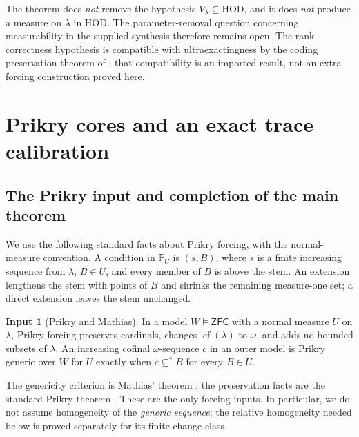 \documentclass[11pt,letterpaper]{article}
\theoremstyle{definition}
\newtheorem{inputthm}{Input}
\numberwithin{equation}{section}
\newcommand{\ZFC}{\mathsf{ZFC}}
\newcommand{\HOD}{\mathrm{HOD}}
\newcommand{\cf}{\operatorname{cf}}
\newcommand{\PP}{\mathbb P}
\newcommand{\substar}{\subseteq^{*}}
\begin{document}
The theorem does \emph{not} remove the hypothesis $V_\lambda\subseteq\HOD$, and it does \emph{not} produce a measure on $\lambda$ in HOD. The parameter-removal question concerning measurability in the supplied synthesis therefore remains open. The rank-correctness hypothesis is compatible with ultraexactingness by the coding preservation theorem of \cite[Proposition~3.9]{abgl}; that compatibility is an imported result, not an extra forcing construction proved here.

\section{Prikry cores and an exact trace calibration}\label{sec:consistency}

\subsection{The Prikry input and completion of the main theorem}

We use the following standard facts about Prikry forcing, with the normal-measure convention. A condition in $\PP_U$ is $(s,B)$, where $s$ is a finite increasing sequence from $\lambda$, $B\in U$, and every member of $B$ is above the stem. An extension lengthens the stem with points of $B$ and shrinks the remaining measure-one set; a direct extension leaves the stem unchanged.

\begin{inputthm}[Prikry and Mathias]\label{in:prikry}
In a model $W\models\ZFC$ with a normal measure $U$ on $\lambda$, Prikry forcing preserves cardinals, changes $\cf(\lambda)$ to $\omega$, and adds no bounded subsets of $\lambda$. An increasing cofinal $\omega$-sequence $c$ in an outer model is Prikry generic over $W$ for $U$ exactly when $c\substar B$ for every $B\in U$.
\end{inputthm}

The genericity criterion is Mathias' theorem \cite{mathias}; the preservation facts are the standard Prikry theorem \cite{prikry,benhamou}. These are the only forcing inputs. In particular, we do not assume homogeneity of the \emph{generic sequence}; the relative homogeneity needed below is proved separately for its finite-change class.
\end{document}
